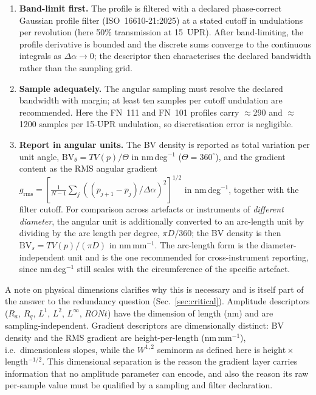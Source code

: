 \documentclass[review]{elsarticle}
\begin{document}
\begin{enumerate}
\item \textbf{Band-limit first.} The profile is filtered with a declared phase-correct Gaussian profile filter (ISO~16610-21:2025) at a stated cutoff in undulations per revolution (here 50\% transmission at 15~UPR). After band-limiting, the profile derivative is bounded and the discrete sums converge to the continuous integrals as $\Delta\alpha\to 0$; the descriptor then characterises the declared bandwidth rather than the sampling grid.
\item \textbf{Sample adequately.} The angular sampling must resolve the declared bandwidth with margin; at least ten samples per cutoff undulation are recommended. Here the FN~111 and FN~101 profiles carry $\approx$290 and $\approx$1200 samples per 15-UPR undulation, so discretisation error is negligible.
\item \textbf{Report in angular units.} The BV density is reported as total variation per unit angle, $\mathrm{BV}_\theta = TV(p)/\Theta$ in nm\,deg$^{-1}$ ($\Theta=360^\circ$), and the gradient content as the RMS angular gradient $g_{\mathrm{rms}} = [\frac{1}{N-1}\sum_j ((p_{j+1}-p_j)/\Delta\alpha)^2]^{1/2}$ in nm\,deg$^{-1}$, together with the filter cutoff. For comparison across artefacts or instruments of \emph{different diameter}, the angular unit is additionally converted to an arc-length unit by dividing by the arc length per degree, $\pi D/360$; the BV density is then $\mathrm{BV}_s = TV(p)/(\pi D)$ in nm\,mm$^{-1}$. The arc-length form is the diameter-independent unit and is the one recommended for cross-instrument reporting, since nm\,deg$^{-1}$ still scales with the circumference of the specific artefact.
\end{enumerate}

A note on physical dimensions clarifies why this is necessary and is itself part of the answer to the redundancy question (Sec.~\ref{sec:critical}). Amplitude descriptors ($R_a$, $R_q$, $L^1$, $L^2$, $L^\infty$, $RONt$) have the dimension of length (nm) and are sampling-independent. Gradient descriptors are dimensionally distinct: BV density and the RMS gradient are height-per-length (nm\,mm$^{-1}$), i.e.\ dimensionless slopes, while the $W^{1,2}$ seminorm as defined here is height\,$\times$\,length$^{-1/2}$. This dimensional separation is the reason the gradient layer carries information that no amplitude parameter can encode, and also the reason its raw per-sample value must be qualified by a sampling and filter declaration.
\end{document}
